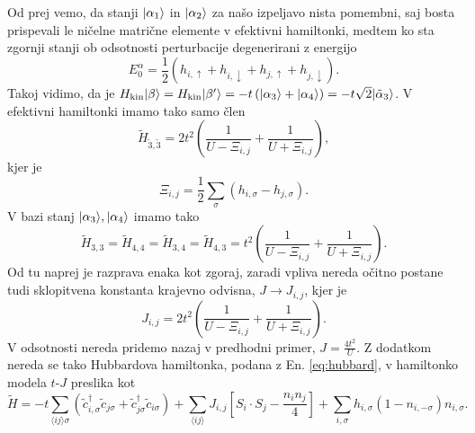 \begin{appendices}
\begin{equation}
\end{equation}
Od prej vemo, da stanji $\vert\alpha_1\rangle$ in $\vert\alpha_2\rangle$ za našo izpeljavo nista pomembni, saj bosta prispevali le ničelne matrične elemente v efektivni hamiltonki, medtem ko sta zgornji stanji ob odsotnosti perturbacije degenerirani z energijo $$E_0^\alpha= \frac{1}{2} \left(h_{i,\uparrow} + h_{i,\downarrow} + h_{j,\uparrow} + h_{j,\downarrow}\right).$$ Takoj vidimo, da je 
$H_\mathrm{kin}\vert\beta\rangle= H_\mathrm{kin}\vert\beta'\rangle=-t\left(\vert\alpha_3\rangle+\vert\alpha_4\rangle\right)=-t\sqrt{2} \vert\tilde{\alpha}_3\rangle$. V efektivni hamiltonki imamo tako samo člen 
$$\tilde{H}_{\tilde{3},\tilde{3}}=2t^2\left(\frac{1}{U - \Xi_{i,j}} + \frac{1}{ U + \Xi_{i,j}}\right), $$
kjer je 
$$\Xi_{i,j}=\frac{1}{2}\sum\limits_\sigma \left(h_{i,\sigma} - h_{j,\sigma}\right).$$
V bazi stanj $\vert\alpha_3\rangle, \vert\alpha_4\rangle$ imamo tako 
$$
\tilde{H}_{3,3}=\tilde{H}_{4,4}=\tilde{H}_{3,4}=\tilde{H}_{4,3}=t^2\left( \frac{1}{U - \Xi_{i,j}} + \frac{1}{U + \Xi_{i,j}}\right).
$$
Od tu naprej je razprava enaka kot zgoraj, zaradi vpliva nereda očitno postane tudi sklopitvena konstanta krajevno odvisna, $J\rightarrow J_{i,j}$, kjer je 
\begin{equation}
J_{i,j}=2t^2 \left( \frac{1}{U-\Xi_{i,j}} + \frac{1}{U+ \Xi_{i,j}}\right).
\end{equation}
V odsotnosti nereda pridemo nazaj v predhodni primer, $J=\frac{4t^2}{U}$. Z dodatkom nereda se tako Hubbardova hamiltonka, podana z En. \eqref{eq:hubbard}, v hamiltonko modela $t$-$J$ preslika kot 
\begin{equation}
\tilde{H}=-t\sum\limits_{\langle ij \rangle \sigma} \left(\tilde{c}^\dagger_{i,\sigma} \tilde{c}_{j\sigma} + \tilde{c}^\dagger_{j\sigma}\tilde{c}_{i\sigma}\right) +\sum\limits_{\langle ij \rangle} J_{i,j}\left[ S_i\cdot  S_j - \frac{n_i n_j}{4}\right] +\sum\limits_{i,\sigma} h_{i,\sigma} \left(1-n_{i,-\sigma}\right)n_{i,\sigma}.
\end{equation}
\end{appendices}


\cleardoublepage
\printindex





